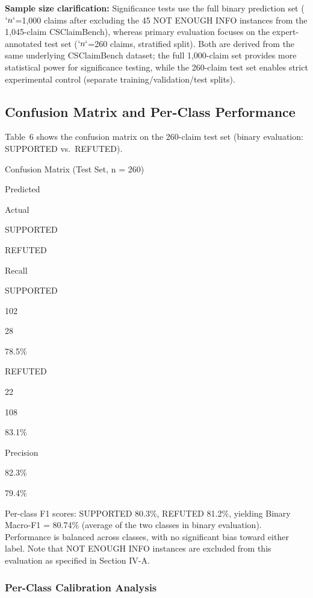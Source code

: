 \textbf{Sample size clarification:} Significance tests use the full binary prediction set (\(`n`\)=1,000 claims after excluding the 45 NOT ENOUGH INFO instances from the 1,045-claim CSClaimBench), whereas primary evaluation focuses on the expert-annotated test set (\(`n`\)=260 claims, stratified split). Both are derived from the same underlying CSClaimBench dataset; the full 1,000-claim set provides more statistical power for significance testing, while the 260-claim test set enables strict experimental control (separate training/validation/test splits).

\subsection{Confusion Matrix and Per-Class Performance}\label{confusion-matrix-and-per-class-performance}

Table~6 shows the confusion matrix on the 260-claim test set (binary evaluation: SUPPORTED vs.~REFUTED).

\protect{}\label{tab:confusion}
Confusion Matrix (Test Set, {n = 260})

Predicted

Actual

SUPPORTED

REFUTED

Recall

SUPPORTED

102

28

78.5\%

REFUTED

22

108

83.1\%

Precision

82.3\%

79.4\%

Per-class F1 scores: SUPPORTED 80.3\%, REFUTED 81.2\%, yielding Binary Macro-F1 = 80.74\% (average of the two classes in binary evaluation). Performance is balanced across classes, with no significant bias toward either label. Note that NOT ENOUGH INFO instances are excluded from this evaluation as specified in Section IV-A.

\subsubsection{Per-Class Calibration Analysis}\label{per-class-calibration-analysis}

